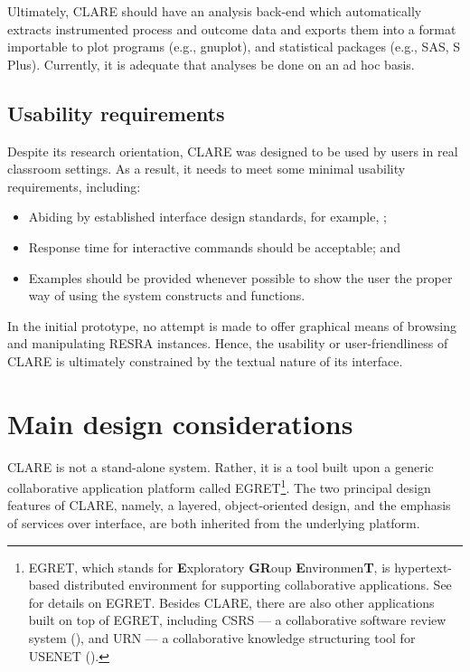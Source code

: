Ultimately, CLARE should have an analysis back-end which
automatically extracts instrumented process and outcome data and exports
them into a format importable to plot programs (e.g., {\sf gnuplot\/}), and
statistical packages (e.g., {\sf SAS}, {\sf S Plus\/}). Currently, it is
adequate that analyses be done on an ad hoc basis.


\subsection{Usability requirements}
\label{sec:usability requirements}

Despite its research orientation, CLARE was designed to be used by users in
real classroom settings. As a result, it needs to meet some minimal
usability requirements, including:

\begin{itemize}
\item Abiding by established interface design standards, for example,
  \cite{Apple87};
  
\item Response time for interactive commands should be acceptable; and
  
\item Examples should be provided whenever possible to show the user the
  proper way of using the system constructs and functions.
\end{itemize}

In the initial prototype, no attempt is made to offer graphical means of
browsing and manipulating RESRA instances. Hence, the usability or
user-friendliness of CLARE is ultimately constrained by the textual nature
of its interface.


\section{Main design considerations}
\label{sec:c4-design}

CLARE is not a stand-alone system. Rather, it is a tool built upon a
generic collaborative application platform called EGRET\footnote{EGRET,
which stands for {\bf E}xploratory {\bf GR}oup {\bf E}nvironmen{\bf T}, is
hypertext-based distributed environment for supporting collaborative
applications. See \cite{csdl-93-09} for details on EGRET. Besides CLARE,
there are also other applications built on top of EGRET, including CSRS ---
a collaborative software review system (\cite{csdl-93-04}), and URN --- a
collaborative knowledge structuring tool for USENET
(\cite{csdl-93-06}).}. The two principal design features of CLARE, namely,
a layered, object-oriented design, and the emphasis of services over
interface, are both inherited from the underlying platform.


